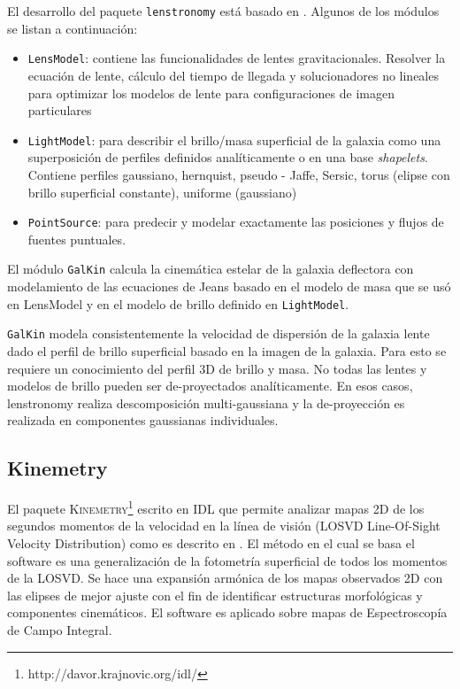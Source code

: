 El desarrollo del paquete \verb+lenstronomy+ está basado en \cite{BI15}. Algunos de los módulos se listan a continuación:

\begin{itemize}
\item \verb+LensModel+: contiene las funcionalidades de lentes gravitacionales. Resolver la ecuación de lente, cálculo del tiempo de llegada y solucionadores no lineales para optimizar los modelos de lente para configuraciones de imagen particulares
\item \verb+LightModel+: para describir el brillo/masa superficial de la galaxia como una superposición de perfiles definidos analíticamente o en una base \emph{shapelets}. Contiene perfiles gaussiano, hernquist, pseudo - Jaffe, Sersic, torus (elipse con brillo superficial constante), uniforme (gaussiano)
\item \verb+PointSource+: para predecir y modelar exactamente las posiciones y flujos de fuentes puntuales.
\end{itemize}

El módulo \verb+GalKin+ calcula la cinemática estelar de la galaxia deflectora con modelamiento de las ecuaciones de Jeans basado en el modelo de masa que se usó en LensModel y en el modelo de brillo definido en \verb+LightModel+.

\verb+GalKin+ modela consistentemente la velocidad de dispersión de la galaxia lente dado el perfil de brillo superficial basado en la imagen de la galaxia. Para esto se requiere un conocimiento del perfil 3D de brillo y masa. No todas las lentes y modelos de brillo pueden ser de-proyectados analíticamente. En esos casos, lenstronomy realiza descomposición multi-gaussiana y la de-proyección es realizada en componentes gaussianas individuales.

\subsection{Kinemetry}

El paquete \textsc{Kinemetry}\footnote{http://davor.krajnovic.org/idl/} escrito en \textsc{IDL} que permite analizar mapas 2D de los segundos momentos de la velocidad en la línea de visión (LOSVD Line-Of-Sight Velocity Distribution) como es descrito en \cite{2006MNRAS.366..787K}. El método en el cual se basa el software es una generalización de la fotometría superficial de todos los momentos de la LOSVD. Se hace una expansión armónica de los mapas observados 2D con las elipses de mejor ajuste con el fin de identificar estructuras morfológicas y componentes cinemáticos. El software es aplicado sobre mapas de Espectroscopía de Campo Integral.\\

